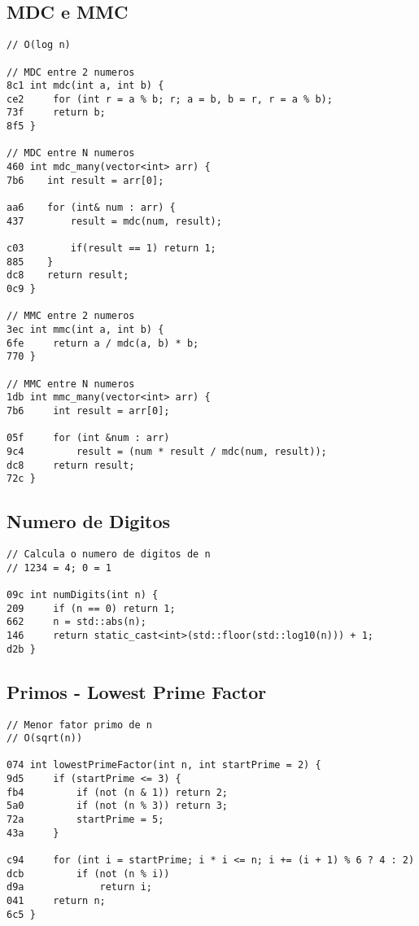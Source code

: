\documentclass[11pt, a4paper, twoside]{article}
\begin{document}
\subsection{MDC e MMC}
\begin{lstlisting}
// O(log n)

// MDC entre 2 numeros
8c1 int mdc(int a, int b) {
ce2     for (int r = a % b; r; a = b, b = r, r = a % b);
73f     return b;
8f5 }

// MDC entre N numeros
460 int mdc_many(vector<int> arr) {
7b6    int result = arr[0];
    
aa6    for (int& num : arr) {
437        result = mdc(num, result);
    
c03        if(result == 1) return 1;
885    }
dc8    return result;
0c9 }

// MMC entre 2 numeros
3ec int mmc(int a, int b) {
6fe     return a / mdc(a, b) * b;
770 }

// MMC entre N numeros
1db int mmc_many(vector<int> arr) {
7b6     int result = arr[0];
    
05f     for (int &num : arr)
9c4         result = (num * result / mdc(num, result));
dc8     return result;
72c }
\end{lstlisting}

\subsection{Numero de Digitos}
\begin{lstlisting}
// Calcula o numero de digitos de n 
// 1234 = 4; 0 = 1

09c int numDigits(int n) {
209     if (n == 0) return 1;
662     n = std::abs(n);
146     return static_cast<int>(std::floor(std::log10(n))) + 1;
d2b }
\end{lstlisting}

\subsection{Primos - Lowest Prime Factor}
\begin{lstlisting}
// Menor fator primo de n
// O(sqrt(n))

074 int lowestPrimeFactor(int n, int startPrime = 2) {
9d5     if (startPrime <= 3) {
fb4         if (not (n & 1)) return 2;
5a0         if (not (n % 3)) return 3;
72a         startPrime = 5;
43a     }
    
c94     for (int i = startPrime; i * i <= n; i += (i + 1) % 6 ? 4 : 2)
dcb         if (not (n % i))
d9a             return i;
041     return n;
6c5 }
\end{lstlisting}
\end{document}
